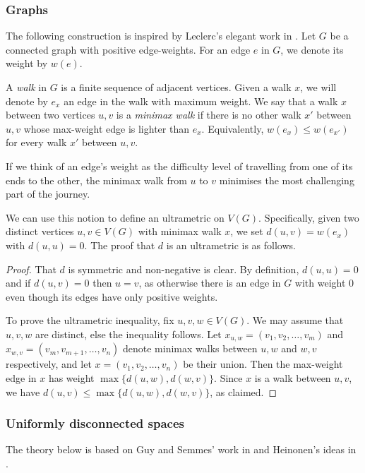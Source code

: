\subsubsection{Graphs} The following construction is inspired by Leclerc's elegant work in \cite{leclerc:1981}. Let \( G \) be a connected graph with positive edge-weights. For an edge \( e \) in \( G \), we denote its weight by \( w(e) \).

A \emph{walk} in \( G \) is a finite sequence of adjacent vertices. Given a walk \( x \), we will denote by \( e_{x} \) an edge in the walk with maximum weight. We say that a walk \( x \) between two vertices \( u , v \) is a \emph{minimax walk} if there is no other walk \( x' \) between \( u,v \) whose max-weight edge is lighter than \( e_{x} \). Equivalently, \( w(e_{x}) \leq w(e_{x'}) \) for every walk \( x' \) between \( u,v \).

If we think of an edge's weight as the difficulty level of travelling from one of its ends to the other, the minimax walk from \( u \) to \( v \) minimises the most challenging part of the journey.

We can use this notion to define an ultrametric on \( V(G) \). Specifically, given two distinct vertices \( u,v \in V(G) \) with minimax walk \( x \), we set \( d(u, v) = w(e_{x}) \) with \( d(u,u) = 0 \). The proof that \( d \) is an ultrametric is as follows.

\begin{proof}
That \( d \) is symmetric and non-negative is clear. By definition, \( d(u, u) = 0 \) and if \( d(u, v) = 0 \) then \( u = v \), as otherwise there is an edge in \( G \) with weight 0 even though its edges have only positive weights.

To prove the ultrametric inequality, fix \( u, v, w \in V(G) \). We may assume that \( u,v,w \) are distinct, else the inequality follows. Let \( x_{u,w} = (v_1, v_2, \hdots , v_{m}) \) and \( x_{w,v} = (v_{m}, v_{m+1} , \hdots , v_{n}) \) denote minimax walks between \( u,w \) and \( w,v \) respectively, and let \( x = (v_1, v_2, \hdots , v_{n}) \) be their union. Then the max-weight edge in \( x \) has weight \( \max \{ d (u, w), d (w,v) \} \). Since \( x \) is a walk between \( u,v \), we have \( d (u, v) \leq \max \{ d (u,w), d (w,v) \} \), as claimed.
\end{proof}

\subsubsection{Uniformly disconnected spaces} The theory below is based on Guy and Semmes' work in \cite{fractal:1997} and Heinonen's ideas in \cite{metric:2001}.


